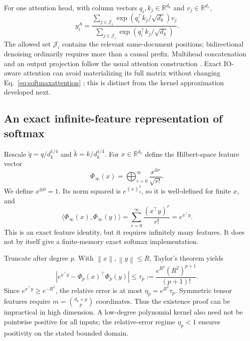 \documentclass{article}
\theoremstyle{remark}\newtheorem{remark}[theorem]{Remark}
\newcommand{\R}{\mathbb R}
\newcommand{\norm}[1]{\left\lVert #1\right\rVert}
\begin{document}
For one attention head, with column vectors $q_i,k_j\in\R^{d_k}$ and $v_j\in\R^{d_v}$,
\begin{equation}
 y_i^A=\frac{\sum_{j\in\mathcal J_i}\exp(q_i^\top k_j/\sqrt{d_k})v_j}
 {\sum_{j\in\mathcal J_i}\exp(q_i^\top k_j/\sqrt{d_k})}.
 \label{eq:softmaxattention}
\end{equation}
The allowed set $\mathcal J_i$ contains the relevant same-document positions; bidirectional denoising ordinarily requires more than a causal prefix. Multihead concatenation and an output projection follow the usual attention construction \cite{transformer}. Exact IO-aware attention can avoid materializing its full matrix without changing Eq.~\eqref{eq:softmaxattention} \cite{flashattention}; this is distinct from the kernel approximation developed next.

\subsection{An exact infinite-feature representation of softmax}
Rescale $\widetilde q=q/d_k^{1/4}$ and $\widetilde k=k/d_k^{1/4}$. For $x\in\R^{d_k}$ define the Hilbert-space feature vector
\begin{equation}
 \Phi_\infty(x)=\bigoplus_{r=0}^{\infty}\frac{x^{\otimes r}}{\sqrt{r!}}.
\end{equation}
We define $x^{\otimes0}=1$. Its norm squared is $e^{\norm{x}_2^2}$, so it is well-defined for finite $x$, and
\begin{equation}
 \langle\Phi_\infty(x),\Phi_\infty(y)\rangle
 =\sum_{r=0}^{\infty}\frac{(x^\top y)^r}{r!}=e^{x^\top y}.
 \label{eq:infinitefeature}
\end{equation}
This is an exact feature identity, but it requires infinitely many features. It does not by itself give a finite-memory exact softmax implementation.

Truncate after degree $p$. With $\norm{x},\norm{y}\le R$, Taylor's theorem yields
\begin{equation}
 \left|e^{x^\top y}-\Phi_p(x)^\top\Phi_p(y)\right|
 \le\tau_p:=\frac{e^{R^2}(R^2)^{p+1}}{(p+1)!}.
 \label{eq:taylorkernel}
\end{equation}
Since $e^{x^\top y}\ge e^{-R^2}$, the relative error is at most
$\eta_p=e^{R^2}\tau_p$. Symmetric tensor features require $m=\binom{d_k+p}{p}$ coordinates. Thus the existence proof can be impractical in high dimension. A low-degree polynomial kernel also need not be pointwise positive for all inputs; the relative-error regime $\eta_p<1$ ensures positivity on the stated bounded domain.
\end{document}
